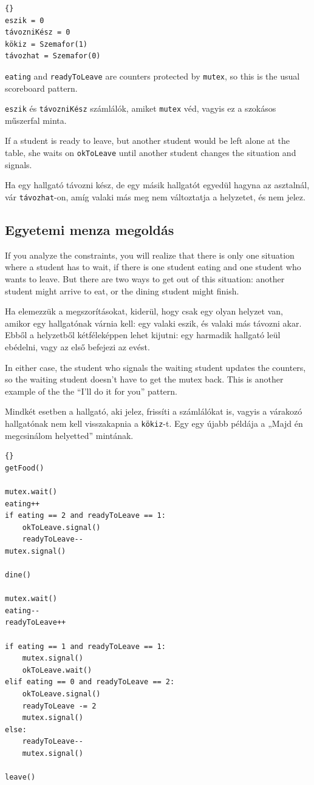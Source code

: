 \documentclass{book}
\newcommand{\clearemptydoublepage}{\newpage\cleardoublepage}
\begin{document}
\begin{lstlisting}[title={Egyetemi menza probléma tipp}]{}
eszik = 0
távozniKész = 0
kökiz = Szemafor(1)
távozhat = Szemafor(0)
\end{lstlisting}

{\tt eating} and {\tt readyToLeave} are
counters protected by {\tt mutex}, so this is the usual
scoreboard pattern.

{\tt eszik} és {\tt távozniKész} számlálók, amiket {\tt mutex} véd,
vagyis ez a szokásos műszerfal minta.

If a student is ready to leave, but another student would be
left alone at the table, she waits on
{\tt okToLeave} until another student changes
the situation and signals.

Ha egy hallgató távozni kész, de egy másik hallgatót
egyedül hagyna az asztalnál, vár {\tt távozhat}-on,
amíg valaki más meg nem változtatja a helyzetet, és
nem jelez.

\clearemptydoublepage
\subsection{Egyetemi menza megoldás}

If you analyze the constraints, you will realize that there
is only one situation where a student has to wait, if there is
one student eating and one student who wants to leave.  But
there are two ways to get out of this situation: another
student might arrive to eat, or the dining student might 
finish.

Ha elemezzük a megszorításokat, kiderül, hogy csak egy olyan
helyzet van, amikor egy hallgatónak várnia kell: egy valaki
eszik, és valaki más távozni akar. Ebből a helyzetből kétféleképpen
lehet kijutni: egy harmadik hallgató leül ebédelni, vagy
az első befejezi az evést.

In either case, the student who signals the waiting student
updates the counters, so the waiting student doesn't have
to get the mutex back.  This is another example of the
the ``I'll do it for you'' pattern.

Mindkét esetben a hallgató, aki jelez, frissíti a számlálókat is,
vagyis a várakozó hallgatónak nem kell visszakapnia a {\tt kökiz}-t.
Egy egy újabb példája a „Majd én megcsinálom helyetted” mintának.

\begin{lstlisting}[title={Dining Hall problem solution}]{}
getFood()

mutex.wait()
eating++
if eating == 2 and readyToLeave == 1:
    okToLeave.signal()
    readyToLeave--
mutex.signal()

dine()

mutex.wait()
eating--
readyToLeave++

if eating == 1 and readyToLeave == 1:
    mutex.signal()
    okToLeave.wait()
elif eating == 0 and readyToLeave == 2:
    okToLeave.signal()
    readyToLeave -= 2
    mutex.signal()
else:
    readyToLeave--
    mutex.signal()

leave()
\end{lstlisting}
\end{document}
